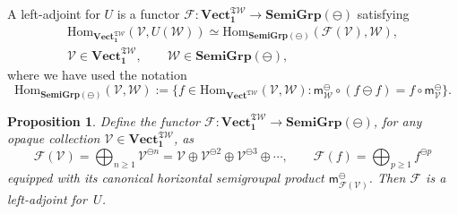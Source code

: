 \documentclass[pdftex]{sigma}
\newcommand{\SWc}{{\mathfrak{T}\mathcal{W}}}
\newcommand\hp{\mathsf{m}^{\ominus}}
\newcommand\CAT[1]{\mathbf{#1}}
\newcommand{\Vect}{\CAT{Vect}}
\newcommand\sgominus{\CAT{SemiGrp}(\ominus)}
\newcommand\icsw{ \Vect^{\SWc} }
\numberwithin{equation}{section}
\newtheorem{Proposition}[Theorem]{Proposition}
\begin{document}
A left-adjoint for $U$ is a functor $\mathcal{F}\colon \icsw_{\mathbf{1}} \to \sgominus$ satisfying
\begin{gather*}
	\mathrm{Hom}_{\icsw_{\mathbf{1}}}(\mathcal{V},U(\mathcal{W})) \simeq \mathrm{Hom}_{\sgominus}(\mathcal{F}(\mathcal{V}),\mathcal{W}),\\ \mathcal{V}\in \icsw_{\mathbf{1}},\qquad \mathcal{W} \in \sgominus,
\end{gather*}
where we have used the notation
\[
	\mathrm{Hom}_{\sgominus}(\mathcal{V},\mathcal{W}) := \{ f\in \mathrm{Hom}_{\icsw}(\mathcal{V},\mathcal{W})\colon \hp_\mathcal{W} \circ (f \ominus f) = f\circ\hp_{\mathcal{V}}\}.
\]
\begin{Proposition}\label{prop:freefunctor}
Define the functor $\mathcal{F}\colon \icsw_{\mathbf{1}} \to \sgominus$, for any opaque collection $\mathcal{V} \in \icsw_{\mathbf{1}} $, as
\begin{equation*}
	\mathcal{F}(\mathcal{V}) = \bigoplus_{n\geq 1} {\mathcal{V}}^{\ominus n} = \mathcal{V} \oplus \mathcal{V}^{\ominus 2} \oplus \mathcal{V}^{\ominus 3} \oplus \cdots,\qquad \mathcal{F}(f) = \bigoplus_{p\geq 1} f^{\ominus p}
\end{equation*}
equipped with its canonical horizontal semigroupal product $\hp_{\mathcal{F}(\mathcal{V})}$. Then $\mathcal{F}$ is a left-adjoint for~$U$.
\end{Proposition}
\end{document}
